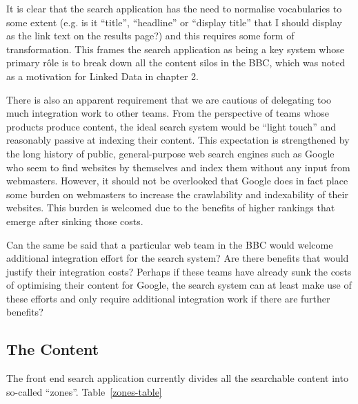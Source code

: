 It is clear that the search application has the need to normalise vocabularies
to some extent (e.g. is it ``title'', ``headline'' or ``display title''
that I should display as the link text on the results page?) and this requires
some form of transformation. This frames the search application as being a
key system whose primary r\^ole is to break down all the content silos in the
BBC, which was noted as a motivation for Linked Data in chapter 2.

There is also an apparent requirement that we are cautious of delegating
too much integration work to other teams. From the perspective of teams
whose products produce content, the ideal search system would be
``light touch'' and reasonably passive at indexing their content. This
expectation is strengthened by the long history of public, general-purpose
web search engines such as Google who seem to find websites by themselves
and index them without any input from webmasters. However, it should
not be overlooked that Google does in fact place some burden on webmasters
to increase the crawlability and indexability of their websites. This
burden is welcomed due to the benefits of higher rankings that emerge
after sinking those costs.

Can the same be said that a particular web team
in the BBC would welcome additional integration effort for the search system?
Are there benefits that would justify their integration costs? Perhaps if
these teams have already sunk the costs of optimising their content for
Google, the search system can at least make use of these efforts and only
require additional integration work if there are further benefits?

\subsection{The Content}
\label{content}

The front end search application currently divides all the searchable
content into so-called ``zones''. Table~\ref{zones-table}

